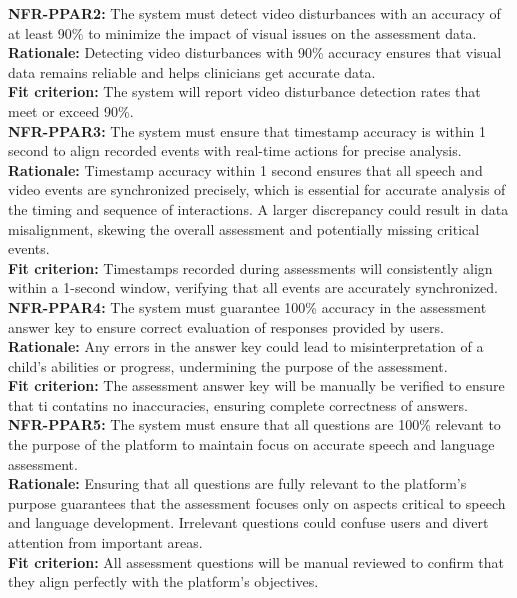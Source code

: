 \documentclass[12pt]{article}
\begin{document}
\noindent\textbf{NFR-PPAR2: }The system must detect video disturbances with an accuracy of at least 90\% to minimize the impact of visual issues on the assessment data.\\
\textbf{Rationale: }Detecting video disturbances with 90\% accuracy ensures that visual data remains reliable and helps clinicians get accurate data.\\
\textbf{Fit criterion: }The system will report video disturbance detection rates that meet or exceed 90\%.\\

\noindent\textbf{NFR-PPAR3: }The system must ensure that timestamp accuracy is within 1 second to align recorded events with real-time actions for precise analysis.\\
\textbf{Rationale: }Timestamp accuracy within 1 second ensures that all speech and video events are synchronized precisely, which is essential for accurate analysis of the timing and sequence of interactions. A larger discrepancy could result in data misalignment, skewing the overall assessment and potentially missing critical events.\\
\textbf{Fit criterion: }Timestamps recorded during assessments will consistently align within a 1-second window, verifying that all events are accurately synchronized.\\

\noindent\textbf{NFR-PPAR4: }The system must guarantee 100\% accuracy in the assessment answer key to ensure correct evaluation of responses provided by users.\\
\textbf{Rationale: }Any errors in the answer key could lead to misinterpretation of a child’s abilities or progress, undermining the purpose of the assessment.\\
\textbf{Fit criterion: }The assessment answer key will be manually be verified to ensure that ti contatins no inaccuracies, ensuring complete correctness of answers.\\

\noindent\textbf{NFR-PPAR5: }The system must ensure that all questions are 100\% relevant to the purpose of the platform to maintain focus on accurate speech and language assessment.\\
\textbf{Rationale: }Ensuring that all questions are fully relevant to the platform’s purpose guarantees that the assessment focuses only on aspects critical to speech and language development. Irrelevant questions could confuse users and divert attention from important areas.\\
\textbf{Fit criterion: }All assessment questions will be manual reviewed to confirm that they align perfectly with the platform's objectives.\\
\end{document}
